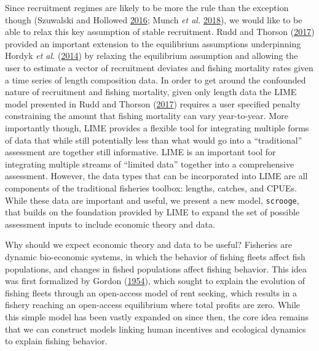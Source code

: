 \documentclass[twoside,12pt,final]{ucthesis-CA2012}
\begin{document}
\begin{ucmainmatter}
Since recruitment regimes are likely to be more the rule than the
exception though (Szuwalski and Hollowed
\protect\hyperlink{ref-Szuwalski2016}{2016}; Munch \emph{et al.}
\protect\hyperlink{ref-Munch2018}{2018}), we would like to be able to
relax this key assumption of stable recruitment. Rudd and Thorson
(\protect\hyperlink{ref-Rudd2017}{2017}) provided an important extension
to the equilibrium assumptions underpinning Hordyk \emph{et al.}
(\protect\hyperlink{ref-Hordyk2014}{2014}) by relaxing the equilibrium
assumption and allowing the user to estimate a vector of recruitment
deviates and fishing mortality rates given a time series of length
composition data. In order to get around the confounded nature of
recruitment and fishing mortality, given only length data the LIME model
presented in Rudd and Thorson (\protect\hyperlink{ref-Rudd2017}{2017})
requires a user specified penalty constraining the amount that fishing
mortality can vary year-to-year. More importantly though, LIME provides
a flexible tool for integrating multiple forms of data that while still
potentially less than what would go into a ``traditional'' assessment
are together still informative. LIME is an important tool for
integrating multiple streams of ``limited data'' together into a
comprehensive assessment. However, the data types that can be
incorporated into LIME are all components of the traditional fisheries
toolbox: lengths, catches, and CPUEs. While these data are important and
useful, we present a new model, \texttt{scrooge}, that builds on the
foundation provided by LIME to expand the set of possible assessment
inputs to include economic theory and data.

Why should we expect economic theory and data to be useful? Fisheries
are dynamic bio-economic systems, in which the behavior of fishing
fleets affect fish populations, and changes in fished populations affect
fishing behavior. This idea was first formalized by Gordon
(\protect\hyperlink{ref-Gordon1954}{1954}), which sought to explain the
evolution of fishing fleets through an open-access model of rent
seeking, which results in a fishery reaching an open-access equilibrium
where total profits are zero. While this simple model has been vastly
expanded on since then, the core idea remains that we can construct
models linking human incentives and ecological dynamics to explain
fishing behavior.


\end{ucmainmatter}
\end{document}
